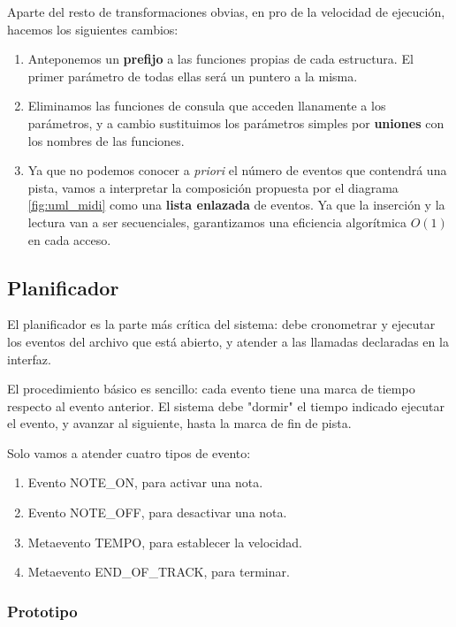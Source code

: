 Aparte del resto de transformaciones obvias, en pro de la velocidad de ejecución, hacemos los siguientes cambios:

\begin{enumerate}
	\item Anteponemos un \textbf{prefijo} a las funciones propias de cada estructura. El primer parámetro de todas ellas será un puntero a la misma.
	
	\item Eliminamos las funciones de consula que acceden llanamente a los parámetros, y a cambio sustituimos los parámetros simples por \textbf{uniones} con los nombres de las funciones.
	
	\item Ya que no podemos conocer a \textit{priori} el número de eventos que contendrá una pista, vamos a interpretar la composición propuesta por el diagrama \ref{fig:uml_midi} como una \textbf{lista enlazada} de eventos. Ya que la inserción y la lectura van a ser secuenciales, garantizamos una eficiencia algorítmica $O(1)$ en cada acceso.
\end{enumerate}

\subsection{Planificador}

El planificador es la parte más crítica del sistema: debe cronometrar y ejecutar los eventos del archivo que está abierto, y atender a las llamadas declaradas en la interfaz.

El procedimiento básico es sencillo: cada evento tiene una marca de tiempo respecto al evento anterior. El sistema debe "dormir" el tiempo indicado ejecutar el evento, y avanzar al siguiente, hasta la marca de fin de pista.

Solo vamos a atender cuatro tipos de evento:

\begin{enumerate}
	\item Evento NOTE\_ON, para activar una nota.
	\item Evento NOTE\_OFF, para desactivar una nota.
	\item Metaevento TEMPO, para establecer la velocidad.
	\item Metaevento END\_OF\_TRACK, para terminar.
\end{enumerate}

\subsubsection{Prototipo}

